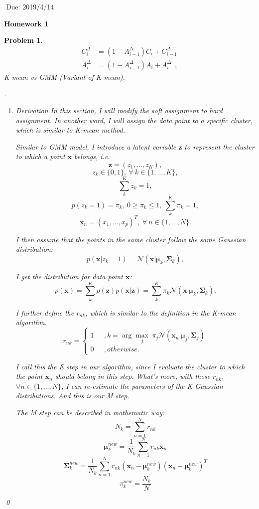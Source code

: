 \documentclass[12pt]{article}
\newtheorem{hw}{Problem}
\newenvironment{sol}
  {\par\vspace{3mm}\noindent{\it Solution}.}
  {\qed}
\newcommand{\argmax}{\arg\!\max}
\newcommand{\xv}{\boldsymbol{x}}
\newcommand{\zv}{\boldsymbol{z}}
\newcommand{\Sigmamat}{\boldsymbol{\Sigma}}
\newcommand{\muv}{\boldsymbol{\mu}}
\newcommand{\ie}{{\em i.e.}}
\begin{document}
$\;$\hfill Due: 2019/4/14

\begin{center}
{\LARGE\bf Homework 1}
\end{center}


\begin{hw}
	$$ 
	\begin{aligned} C_{i}^{\Delta} &=\left(1-A_{i-1}^{\mathrm{\Delta}}\right) C_{i}+C_{i-1}^{\Delta} \\ A_{i}^{\Delta} &=\left(1-A_{i-1}^{\Delta}\right) A_{i}+A_{i-1}^{\Delta} \end{aligned}
	$$
K-mean vs GMM (Variant of K-mean).
\begin{sol}
	\begin{enumerate}
		\item[(1)]{
			Derivation	
			In this section, I will modify the soft assignment to hard assignment. In another word, I will assign the data point to a specific cluster, which is similar to K-mean method.  
			
			Similar to GMM model, I introduce a latent variable $\zv$ to represent the cluster to which a point $\xv$ belongs, \ie 
			$$\zv = (z_1,\ldots,z_K),$$
			$$z_k\in\{0,1\},~\forall~k\in\{1,\ldots,K\},$$
			$$\sum_{k}^{K}z_k = 1,$$
			$$p(z_k=1) = \pi_k,~0\ge\pi_k\le1,~\sum_{k}^{K}\pi_k = 1,$$
			$$\xv_n = (x_1,\ldots,x_p)^T,~\forall~n\in\{1,\ldots,N\}.$$
			
			I then assume that the points in the same cluster follow the same Gaussian distribution:
			$$p(\xv|z_k=1) = \mathcal{N}(\xv|\muv_k,\Sigmamat_k),$$
			
			I get the distribution for data point $\xv$:
			$$p(\xv) = \sum_{k}^{K}p(\zv)p(\xv|\zv) = \sum_{k}^{K}\pi_k\mathcal{N}(\xv|\muv_k,\Sigmamat_k).$$
		
			I further define the $r_{nk}$, which is similar to the definition in the K-mean algorithm.
			$$
				r_{nk} = \left\{
					\begin{aligned}
					1&~~~,k=\argmax_j~\pi_j\mathcal{N}(\xv_n|\muv_j,\Sigmamat_j)\\
					0&~~~,otherwise.
					\end{aligned}
				\right.
			$$
			
			I call this the E step in our algorithm, since I evaluate the cluster to which the point $\xv_n$ should belong in this step. What's more, with these $r_{nk}$,  $\forall n\in\{1,\ldots,N\}$, I can re-estimate the parameters of the K Gaussian distributions. And this is our M step.
			
			The M step can be described in mathematic way:
			$$N_k = \sum_{n=1}^{N} r_{nk}$$
			$$\muv_k^{new} = \frac{1}{N_k}\sum_{n=1}^{N}r_{nk}\xv_n$$
			$$\Sigmamat_k^{new} = \frac{1}{N_k}\sum_{n=1}^{N}r_{nk}(\xv_n-\muv_k^{new})(\xv_n-\muv_k^{new})^{T}$$
			$$\pi_k^{new} = \frac{N_k}{N}$$
				
}
\end{enumerate}
\end{sol}
\end{hw}
\end{document}
